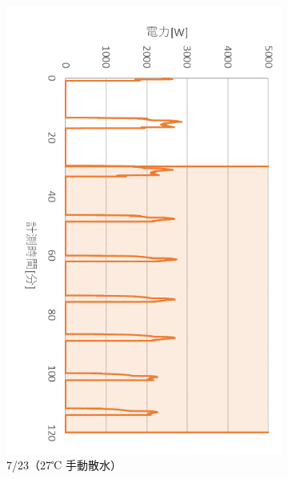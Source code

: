 \documentclass[a4j,fleqn,dvipdfmx,uplatex]{jsarticle}
\begin{document}
\begin{figure}[htb]
  \addtocounter{figure}{-1}
  \centering
  \begin{subfigure}[b]{0.4\hsize}
    \addtocounter{subfigure}{4} %
    \centering
    \includegraphics[width=\linewidth]{img/t_p/20220723.png}
    \caption{7/23（27℃ 手動散水）}
  \end{subfigure}
  \begin{subfigure}[b]{0.4\hsize}
      \centering

\end{subfigure}
\end{figure}
\end{document}
